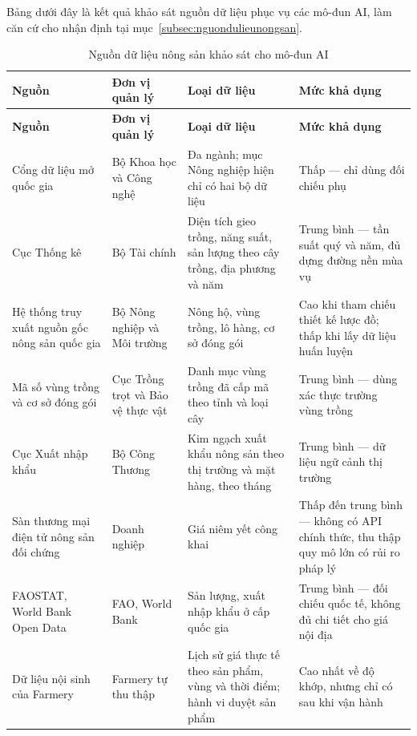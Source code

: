 Bảng dưới đây là kết quả khảo sát nguồn dữ liệu phục vụ các mô-đun AI, làm căn cứ cho nhận định tại mục~\ref{subsec:nguondulieunongsan}.

\begingroup
\tblsetup\tblzebra
\begin{longtable}{L{3.64cm} L{2.78cm} L{4.48cm} L{3.64cm}}
\caption{Nguồn dữ liệu nông sản khảo sát cho mô-đun AI}
\label{tab:nguondulieu} \\
\toprule
{}
\textbf{Nguồn} & \textbf{Đơn vị quản lý} & \textbf{Loại dữ liệu} & \textbf{Mức khả dụng} \\
\midrule
\endfirsthead
\toprule
{}
\textbf{Nguồn} & \textbf{Đơn vị quản lý} & \textbf{Loại dữ liệu} & \textbf{Mức khả dụng} \\
\midrule
\endhead
\bottomrule
\endfoot
Cổng dữ liệu mở quốc gia & Bộ Khoa học và Công nghệ & Đa ngành; mục Nông nghiệp hiện chỉ có hai bộ dữ liệu & Thấp --- chỉ dùng đối chiếu phụ \\
Cục Thống kê & Bộ Tài chính & Diện tích gieo trồng, năng suất, sản lượng theo cây trồng, địa phương và năm & Trung bình --- tần suất quý và năm, đủ dựng đường nền mùa vụ \\
Hệ thống truy xuất nguồn gốc nông sản quốc gia & Bộ Nông nghiệp và Môi trường & Nông hộ, vùng trồng, lô hàng, cơ sở đóng gói & Cao khi tham chiếu thiết kế lược đồ; thấp khi lấy dữ liệu huấn luyện \\
Mã số vùng trồng và cơ sở đóng gói & Cục Trồng trọt và Bảo vệ thực vật & Danh mục vùng trồng đã cấp mã theo tỉnh và loại cây & Trung bình --- dùng xác thực trường vùng trồng \\
Cục Xuất nhập khẩu & Bộ Công Thương & Kim ngạch xuất khẩu nông sản theo thị trường và mặt hàng, theo tháng & Trung bình --- dữ liệu ngữ cảnh thị trường \\
Sàn thương mại điện tử nông sản đối chứng & Doanh nghiệp & Giá niêm yết công khai & Thấp đến trung bình --- không có API chính thức, thu thập quy mô lớn có rủi ro pháp lý \\
FAOSTAT, World Bank Open Data & FAO, World Bank & Sản lượng, xuất nhập khẩu ở cấp quốc gia & Trung bình --- đối chiếu quốc tế, không đủ chi tiết cho giá nội địa \\
Dữ liệu nội sinh của Farmery & Farmery tự thu thập & Lịch sử giá thực tế theo sản phẩm, vùng và thời điểm; hành vi duyệt sản phẩm & Cao nhất về độ khớp, nhưng chỉ có sau khi vận hành \\
\end{longtable}
\endgroup
